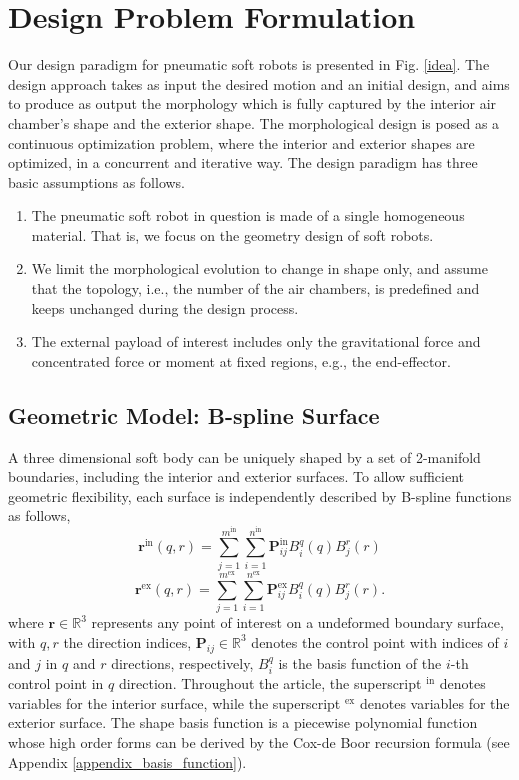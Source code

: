 \documentclass[journal]{IEEEtran}
\renewcommand{\vec}[1]{\mathbf{#1}}
\theoremstyle{definition}
\renewcommand{\vec}[1]{\mathbf{#1}}
\begin{document}
\section{Design Problem Formulation}
Our design paradigm for pneumatic soft robots is presented in Fig. \ref{idea}. The design approach takes as input the desired motion and an initial design, and aims to produce as output the morphology which is fully captured by the interior air chamber's shape and the exterior shape. The morphological design is posed as a continuous optimization problem, where the interior and exterior shapes are optimized, in a concurrent and iterative way. The design paradigm has three basic assumptions as follows.
\begin{enumerate}
  \item The pneumatic soft robot in question is made of a single homogeneous material. That is, we focus on the geometry design of soft robots.
  \item We limit the morphological evolution to change in shape only, and assume that the topology, i.e., the number of the air chambers, is predefined and keeps unchanged during the design process.
  \item The external payload of interest includes only the gravitational force and concentrated force or moment at fixed regions, e.g., the end-effector.
\end{enumerate}

\subsection{Geometric Model: B-spline Surface}
A three dimensional soft body can be uniquely shaped by a set of 2-manifold boundaries, including the interior and exterior surfaces. To allow sufficient geometric flexibility, each surface is independently described by B-spline functions as follows,
\begin{equation}
  \vec{r}^{\text{in}}(q,r)=\sum_{j=1}^{m^{\text{in}}} \sum_{i=1}^{n^{\text{in}}} \vec{P}_{ij}^{\text{in}} B_{i}^q(q) B_{j}^r(r)
  \label{HJeq2}
\end{equation}
\begin{equation}
  \vec{r}^{\text{ex}}(q,r)=\sum_{j=1}^{m^{\text{ex}}} \sum_{i=1}^{n^{\text{ex}}} \vec{P}_{ij}^{\text{ex}} B_{i}^q(q) B_{j}^r(r).
  \label{HJeq2}
\end{equation}
where $\vec{r}\in\mathbb{R}^3$ represents any point of interest on a undeformed boundary surface, with $q, r$ the direction indices, $\mathbf{P}_{ij}\in\mathbb{R}^3$ denotes the control point with indices of $i$ and $j$ in $q$ and $r$ directions, respectively, $B_i^q$ is the basis function of the $i$-th control point in $q$ direction. Throughout the article, the superscript $^{\text{in}}$ denotes variables for the interior surface, while the superscript $^{\text{ex}}$ denotes variables for the exterior surface. The shape basis function is a piecewise polynomial function whose high order forms can be derived by the Cox-de Boor recursion formula (see Appendix \ref{appendix_basis_function}).
\end{document}
